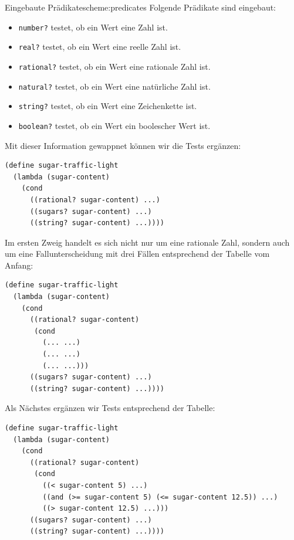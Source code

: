 \begin{feature}{Eingebaute Prädikate}{scheme:predicates}
  Folgende Prädikate sind eingebaut:
  \begin{itemize}
  \item \lstinline{number?} testet, ob ein Wert eine Zahl ist.
  \item \lstinline{real?} testet, ob ein Wert eine reelle Zahl ist.
  \item \lstinline{rational?} testet, ob ein Wert eine rationale Zahl ist.
  \item \lstinline{natural?} testet, ob ein Wert eine natürliche Zahl ist.
  \item \lstinline{string?} testet, ob ein Wert eine Zeichenkette ist.
  \item \lstinline{boolean?} testet, ob ein Wert ein boolescher Wert ist.
  \end{itemize}
\end{feature}
%
Mit dieser Information gewappnet können wir die Tests ergänzen:
%
\begin{lstlisting}
(define sugar-traffic-light
  (lambda (sugar-content)
    (cond
      ((rational? sugar-content) ...)
      ((sugars? sugar-content) ...)
      ((string? sugar-content) ...))))
\end{lstlisting}         
%
Im ersten Zweig handelt es sich nicht nur um eine rationale Zahl,
sondern auch um eine Fallunterscheidung mit drei Fällen entsprechend
der Tabelle vom Anfang:
%
\begin{lstlisting}
(define sugar-traffic-light
  (lambda (sugar-content)
    (cond
      ((rational? sugar-content) 
       (cond
         (... ...)
         (... ...)
         (... ...)))
      ((sugars? sugar-content) ...)
      ((string? sugar-content) ...))))
\end{lstlisting}         
%
Als Nächstes ergänzen wir Tests entsprechend der Tabelle:
%
\begin{lstlisting}
(define sugar-traffic-light
  (lambda (sugar-content)
    (cond
      ((rational? sugar-content) 
       (cond
         ((< sugar-content 5) ...)
         ((and (>= sugar-content 5) (<= sugar-content 12.5)) ...)
         ((> sugar-content 12.5) ...)))
      ((sugars? sugar-content) ...)
      ((string? sugar-content) ...))))
\end{lstlisting}         
